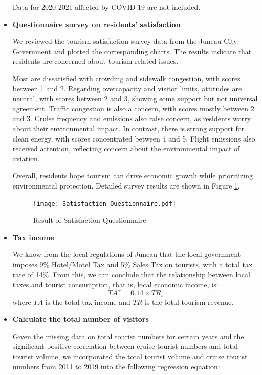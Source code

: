 \documentclass{mcmthesis}
\begin{document}
\begin{itemize}
\begin{table}[htbp]
  \vspace{0.5em}
  {\small\color{NoteColor}\raggedright 
    Data for 2020-2021 affected by COVID-19 are not included.
  }
\end{table}
  \item \textbf{Questionnaire survey on residents' satisfaction}\par
  We reviewed the tourism satisfaction survey data from the Juneau City Government 
  and plotted the corresponding charts. The results indicate that residents are 
  concerned about tourism-related issues.\par Most are dissatisfied with crowding and 
  sidewalk congestion, with scores between 1 and 2. Regarding overcapacity and 
  visitor limits, attitudes are neutral, with scores between 2 and 3, showing some 
  support but not universal agreement. Traffic congestion is also a concern, with 
  scores mostly between 2 and 3. Cruise frequency and emissions also raise concern, 
  as residents worry about their environmental impact. In contrast, there is strong 
  support for clean energy, with scores concentrated between 4 and 5. Flight emissions 
  also received attention, reflecting concern about the environmental impact of 
  aviation.\par Overall, residents hope tourism can drive economic growth while prioritizing 
  environmental protection. Detailed survey results are shown in Figure \ref{fig:satisfy}.
  \begin{figure}[h] 
    \centering
    {\texttt{[image: Satisfaction Questionnaire.pdf]}} %
    \caption{Result of Satisfaction Questionnaire} \label{fig:satisfy}
  \end{figure}
  \item \textbf{Tax income}\par
  We know from the local regulations of Juneau that the local government imposes 9\% Hotel/Motel Tax and 5\% Sales Tax on tourists, with a total tax rate of 14\%. From this, we can conclude that the relationship between local taxes and tourist consumption, that is, local economic income, is:
  \begin{equation}
    \label{eq:tax}
    TA^\alpha = 0.14 \times TR_i
  \end{equation}
  where $TA$ is the total tax income and $TR$ is the total tourism revenue.
  \item \textbf{Calculate the total number of visitors}\par
  Given the missing data on total tourist numbers for certain years and the significant positive correlation between cruise tourist numbers and total tourist volume, we incorporated the total tourist volume and cruise tourist numbers from 2011 to 2019 into the following regression equation:


\end{itemize}
\end{document}
